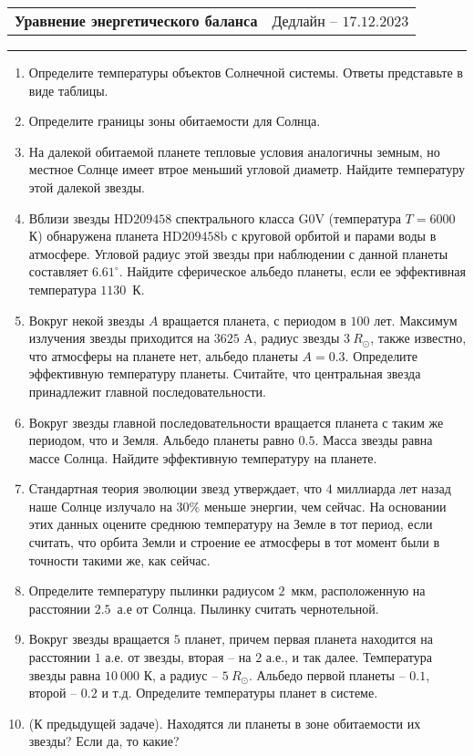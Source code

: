 \documentclass[12pt]{article}
\begin{document}
 \begin{tabularx}{\textwidth}{Xr}
  {\Large \textbf{Уравнение энергетического баланса}} & Дедлайн -- $17.12.2023$ \\
 \end{tabularx}
 \noindent\rule{\textwidth}{0.4pt}
 \begin{enumerate}
        \item Определите температуры объектов Солнечной системы. Ответы представьте в виде таблицы.
        \item Определите границы зоны обитаемости для Солнца.
        \item На далекой обитаемой планете тепловые условия аналогичны земным, но местное Солнце имеет втрое меньший угловой диаметр. Найдите температуру этой далекой звезды.
        \item Вблизи звезды HD$209458$ спектрального класса G$0$V (температура $T = 6000$ К) обнаружена планета HD$209458$b с круговой орбитой и парами воды в атмосфере. Угловой радиус этой звезды при наблюдении с данной планеты составляет $6.61^{\circ}$. Найдите сферическое альбедо планеты, если ее эффективная температура $1130$~К.
        \item Вокруг некой звезды $A$ вращается планета, с периодом в $100$ лет. Максимум излучения звезды приходится на $3625$ A, радиус звезды $3~R_{\odot}$, также известно, что атмосферы на планете нет, альбедо планеты $A=0.3$. Определите эффективную температуру планеты. Считайте, что центральная звезда принадлежит главной последовательности.
        \item Вокруг звезды главной последовательности вращается планета с таким же периодом, что и Земля. Альбедо планеты равно $0.5$. Масса звезды равна массе Солнца. Найдите эффективную температуру на планете.
        \item Стандартная теория эволюции звезд утверждает, что $4$ миллиарда лет назад наше Солнце излучало на $30\%$ меньше энергии, чем сейчас. На основании этих данных оцените среднюю температуру на Земле в тот период, если считать, что орбита Земли и строение ее атмосферы в тот момент были в точности такими же, как сейчас.
        \item Определите температуру пылинки радиусом $2$~мкм, расположенную на расстоянии $2.5$~а.е от Солнца. Пылинку считать чернотельной.
        \item Вокруг звезды вращается $5$ планет, причем первая планета находится на расстоянии $1$ а.е. от звезды, вторая -- на $2$ а.е., и так далее. Температура звезды равна $10~000$ К, а радиус -- $5~R_{\odot}$. Альбедо первой планеты -- $0.1$, второй -- $0.2$ и т.д. Определите температуры планет в системе.
        \item (К предыдущей задаче). Находятся ли планеты в зоне обитаемости их звезды? Если да, то какие? 
 \end{enumerate}
\end{document}
